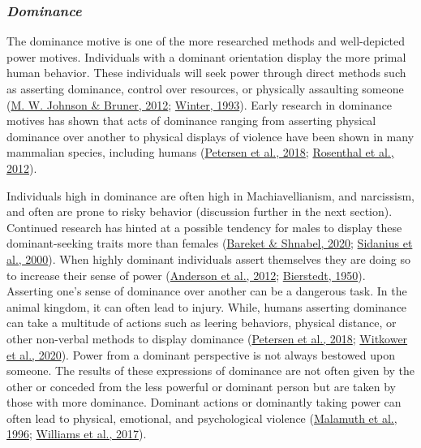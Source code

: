 \documentclass[
  donotrepeattitle,doc, 12pt, a4paper,floatsintext]{apa7}
\begin{document}
\hypertarget{dominance}{%
\subsubsection{\texorpdfstring{\emph{Dominance}}{Dominance}}\label{dominance}}

The dominance motive is one of the more researched methods and well-depicted power motives. Individuals with a dominant orientation display the more primal human behavior. These individuals will seek power through direct methods such as asserting dominance, control over resources, or physically assaulting someone (\protect\hyperlink{ref-johnson2012}{M. W. Johnson \& Bruner, 2012}; \protect\hyperlink{ref-winter1993}{Winter, 1993}). Early research in dominance motives has shown that acts of dominance ranging from asserting physical dominance over another to physical displays of violence have been shown in many mammalian species, including humans (\protect\hyperlink{ref-petersen2018}{Petersen et al., 2018}; \protect\hyperlink{ref-rosenthal2012}{Rosenthal et al., 2012}).

Individuals high in dominance are often high in Machiavellianism, and narcissism, and often are prone to risky behavior (discussion further in the next section). Continued research has hinted at a possible tendency for males to display these dominant-seeking traits more than females (\protect\hyperlink{ref-bareket2020}{Bareket \& Shnabel, 2020}; \protect\hyperlink{ref-sidanius2000}{Sidanius et al., 2000}). When highly dominant individuals assert themselves they are doing so to increase their sense of power (\protect\hyperlink{ref-anderson2012}{Anderson et al., 2012}; \protect\hyperlink{ref-bierstedt1950}{Bierstedt, 1950}). Asserting one's sense of dominance over another can be a dangerous task. In the animal kingdom, it can often lead to injury. While, humans asserting dominance can take a multitude of actions such as leering behaviors, physical distance, or other non-verbal methods to display dominance (\protect\hyperlink{ref-petersen2018}{Petersen et al., 2018}; \protect\hyperlink{ref-witkower2020}{Witkower et al., 2020}). Power from a dominant perspective is not always bestowed upon someone. The results of these expressions of dominance are not often given by the other or conceded from the less powerful or dominant person but are taken by those with more dominance. Dominant actions or dominantly taking power can often lead to physical, emotional, and psychological violence (\protect\hyperlink{ref-malamuth1996}{Malamuth et al., 1996}; \protect\hyperlink{ref-williams2017}{Williams et al., 2017}).
\end{document}
